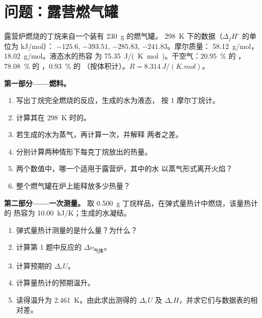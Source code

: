 \section{问题：露营燃气罐}

\begin{problem}
\label{pb:b2:reaction-enthalpy:1}
露营炉燃烧的丁烷来自一个装有 \qty{230}{g} 的燃气罐。
\qty{298}{K} 下的数据（$\Delta_f H^\circ$ 的单位为 \unit{kJ/mol}）：
$-125.6$,  $-393.51$,  $-285.83$, 
$-241.83$。摩尔质量： \qty{58.12}{g/mol}，
\qty{18.02}{g/mol}。液态水的热容
为 \qty{75.35}{J/(K.mol)}。干空气：\qty{20.95}{\percent} 的 ，
\qty{78.08}{\percent} 的 ，\qty{0.93}{\percent} 的 （按体积计）。$R = \qty{8.314}{J/(K.mol)}$。

\medskip
\noindent\textbf{第一部分——燃料。}
\begin{enumerate}
  \item 写出丁烷完全燃烧的反应，生成的水为液态，
        按 1 摩尔丁烷计。
  \item 计算其在 \qty{298}{K} 时的。
  \item 若生成的水为蒸气，再计算一次，并解释
        两者之差。
  \item 分别计算两种情形下每克丁烷放出的热量。
  \item 两个数值中，哪一个适用于露营炉，其中的水
        以蒸气形式离开火焰？
  \item 整个燃气罐在炉上能释放多少热量？
\end{enumerate}

\medskip
\noindent\textbf{第二部分——一次测量。}
取 \qty{0.500}{g} 丁烷样品，在弹式量热计中燃烧，该量热计的
热容为 \qty{10.00}{kJ/K}；生成的水凝结。
\begin{enumerate}[resume]
  \item 弹式量热计测量的是什么量？为什么？
  \item 计算第 1 题中反应的 $\Delta\nu_{\text{气体}}$。
  \item 计算预期的 $\Delta_r U$。
  \item 计算量热计的预期温升。
  \item 读得温升为 \qty{2.461}{K}。由此求出测得的 $\Delta_r U$
        及 $\Delta_r H$，并求它们与数据表的相对差。
\end{enumerate}


\end{problem}
